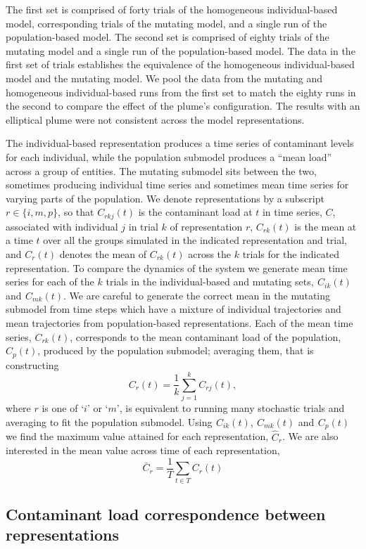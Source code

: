 The first set is comprised of forty trials of the homogeneous individual-based
model, corresponding trials of the mutating model, and a single run of the
population-based model. The second set is comprised of eighty trials of the
mutating model and a single run of the population-based model. The data in the
first set of trials establishes the equivalence of the homogeneous
individual-based model and the mutating model. We pool the data from the
mutating and homogeneous individual-based runs from the first set to match the
eighty runs in the second to compare the effect of the plume's configuration.
The results with an elliptical plume were not consistent across the model
representations.

The individual-based representation produces a time series of
contaminant levels for each individual, while the population submodel
produces a ``mean load'' across a group of entities. The mutating
submodel sits between the two, sometimes producing individual time
series and sometimes mean time series for varying parts of the
population. We denote representations by a subscript $r \in \{i, m,
p\}$, so that $C_{r k j} (t)$ is the contaminant load at $t$ in time
series, $C$, associated with individual $j$ in trial $k$ of
representation $r$, $C_{r k} (t)$ is the mean at a time $t$ over all the
groups simulated in the indicated representation and trial, and $C_r (t)$
denotes the mean of $C_{r k} (t)$ across the $k$ trials for the indicated
representation. To compare the dynamics of the system we generate mean
time series for each of the $k$ trials in the individual-based and
mutating sets, $^{} C_{i k} (t)$ and $^{} C_{m k} (t)$. We are careful to
generate the correct mean in the mutating submodel from time steps
which have a mixture of individual trajectories and mean trajectories
from population-based representations. Each of the mean time series,
$C_{r k} (t)$, corresponds to the mean contaminant load of the
population, $C_p (t)$, produced by the population submodel; averaging
them, that is constructing
\[ C_r (t) = \frac{1}{k} \sum^k_{j = 1} C_{r j} (t), \]
where $r$ is one of `$i$' or `$m$', is equivalent to running many
stochastic trials and averaging to fit the population submodel. Using
$^{} C_{i k} (t)$, $^{} C_{m k} (t)$ and $^{} C_p (t)$ we find the
maximum value attained for each representation, $\hat{C}_r$. We are
also interested in the mean value across time of each representation,
\[ {\bar{C}}_r = \frac{1}{T} \sum_{t \in T} C_r (t) \]


\subsection{Contaminant load correspondence between
representations}\label{Correspondence}



